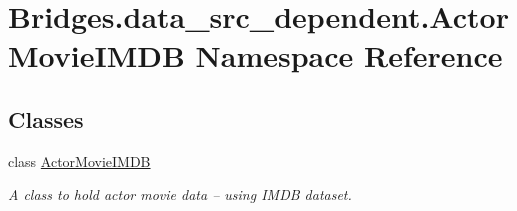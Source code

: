 \hypertarget{namespace_bridges_1_1data__src__dependent_1_1_actor_movie_i_m_d_b}{}\section{Bridges.\+data\+\_\+src\+\_\+dependent.\+Actor\+Movie\+I\+M\+D\+B Namespace Reference}
\label{namespace_bridges_1_1data__src__dependent_1_1_actor_movie_i_m_d_b}
\subsection*{Classes}
\begin{DoxyCompactItemize}
\item 
class \hyperlink{class_bridges_1_1data__src__dependent_1_1_actor_movie_i_m_d_b_1_1_actor_movie_i_m_d_b}{Actor\+Movie\+I\+M\+D\+B}
\begin{DoxyCompactList}\small\item\em A class to hold actor movie data -- using I\+M\+D\+B dataset. \end{DoxyCompactList}\end{DoxyCompactItemize}
